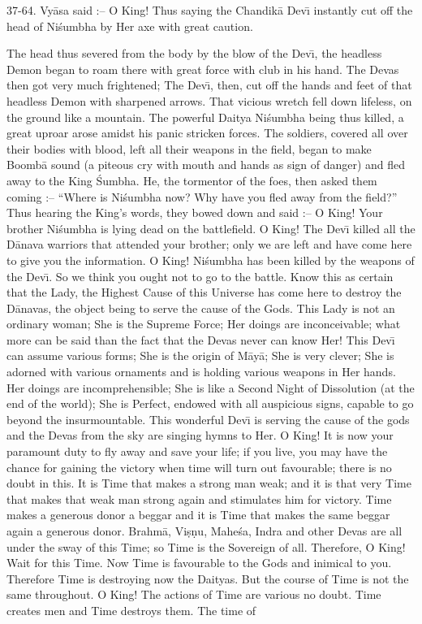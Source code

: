 37-64. Vy\=asa said :-- O King! Thus saying the Chandik\=a Dev\={\i} instantly cut off the head of Ni\'sumbha by Her axe with great caution.

The head thus severed from the body by the blow of the Dev\={\i}, the headless Demon began to roam there with great force with club in his hand. The Devas then got very much frightened; The Dev\={\i}, then, cut off the hands and feet of that headless Demon with sharpened arrows. That vicious wretch fell down lifeless, on the ground like a mountain. The powerful Daitya Ni\'sumbha being thus killed, a great uproar arose amidst his panic stricken forces. The soldiers, covered all over their bodies with blood, left all their weapons in the field, began to make Boomb\=a sound (a piteous cry with mouth and hands as sign of danger) and fled away to the King \'Sumbha. He, the tormentor of the foes, then asked them coming :-- ``Where is Ni\'sumbha now? Why have you fled away from the field?'' Thus hearing the King's words, they bowed down and said :-- O King! Your brother Ni\'sumbha is lying dead on the battlefield. O King! The Dev\={\i} killed all the D\=anava warriors that attended your brother; only we are left and have come here to give you the information. O King! Ni\'sumbha has been killed by the weapons of the Dev\={\i}. So we think you ought not to go to the battle. Know this as certain that the Lady, the Highest Cause of this Universe has come here to destroy the D\=anavas, the object being to serve the cause of the Gods. This Lady is not an ordinary woman; She is the Supreme Force; Her doings are inconceivable; what more can be said than the fact that the Devas never can know Her! This Dev\={\i} can assume various forms; She is the origin of M\=ay\=a; She is very clever; She is adorned with various ornaments and is holding various weapons in Her hands. Her doings are incomprehensible; She is like a Second Night of Dissolution (at the end of the world); She is Perfect, endowed with all auspicious signs, capable to go beyond the insurmountable. This wonderful Dev\={\i} is serving the cause of the gods and the Devas from the sky are singing hymns to Her. O King! It is now your paramount duty to fly away and save your life; if you live, you may have the chance for gaining the victory when time will turn out favourable; there is no doubt in this. It is Time that makes a strong man weak; and it is that very Time that makes that weak man strong again and stimulates him for victory. Time makes a generous donor a beggar and it is Time that makes the same beggar again a generous donor. Brahm\=a, Vi\d{s}\d{n}u, Mahe\'sa, Indra and other Devas are all under the sway of this Time; so Time is the Sovereign of all. Therefore, O King! Wait for this Time. Now Time is favourable to the Gods and inimical to you. Therefore Time is destroying now the Daityas. But the course of Time is not the same throughout. O King! The actions of Time are various no doubt. Time creates men and Time destroys them. The time of

